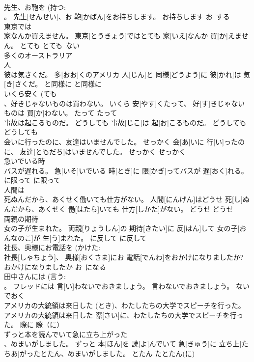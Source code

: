 \documentclass[8pt]{extreport}
\begin{document}
\begin{CJK}{UTF8}{min}
\\	先生、お鞄を (持つ: 
\\	。	先生[せんせい]、お 鞄[かばん]をお持ちします。	お持ちします	お~する	
\\	東京では 
\\	家なんか買えません。	東京[とうきょう]ではとても 家[いえ]なんか 買[か]えません。	とても	とても~ない	
\\	多くのオーストラリア
\\	人 
\\	彼は気さくだ。	多[おお]くのアメリカ 人[じん]と 同様[どうよう]に 彼[かれ]は 気[き]さくだ。	と同様に	と同様に	
\\	いくら安く (ても 
\\	、好きじゃないものは買わない。	いくら 安[やす]くたって、 好[す]きじゃないものは 買[か]わない。	たって	たって	
\\	事故は起こるものだ。	どうしても 事故[じこ]は 起[お]こるものだ。	どうしても	どうしても~	
\\	会いに行ったのに、友達はいませんでした。	せっかく 会[あ]いに 行[い]ったのに、 友達[ともだち]はいませんでした。	せっかく	せっかく~	
\\	急いでいる時 
\\	バスが遅れる。	急[いそ]いでいる 時[とき]に 限[かぎ]ってバスが 遅[おく]れる。	に限って	に限って	
\\	人間は 
\\	死ぬんだから、あくせく働いても仕方がない。	人間[にんげん]はどうせ 死[し]ぬんだから、あくせく 働[はたら]いても 仕方[しかた]がない。	どうせ	どうせ~	
\\	両親の期待 
\\	女の子が生まれた。	両親[りょうしん]の 期待[きたい]に 反[はん]して 女の子[おんなのこ]が 生[う]まれた。	に反して	に反して	
\\	社長、奥様にお電話を (かけた: 
\\	社長[しゃちょう]、 奥様[おくさま]にお 電話[でんわ]をおかけになりましたか?	おかけになりましたか	お~になる	
\\	田中さんには (言う: 
\\	。	フレッドには 言[い]わないでおきましょう。	言わないでおきましょう。	ないでおく	
\\	アメリカの大統領は来日した (とき)、わたしたちの大学でスピーチを行った。	アメリカの大統領は来日した 際[さい]に、わたしたちの大学でスピーチを行った。	際に	際（に）	
\\	ずっと本を読んでいて急に立ち上がった 
\\	、めまいがしました。	ずっと 本[ほん]を 読[よ]んでいて 急[きゅう]に 立ち上[たちあ]がったとたん、めまいがしました。	とたん	たとたん(に)	

\end{CJK}
\end{document}
